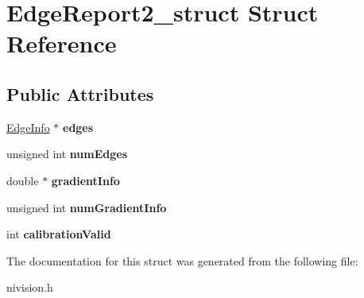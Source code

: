 \hypertarget{structEdgeReport2__struct}{
\section{EdgeReport2\_\-struct Struct Reference}
\label{structEdgeReport2__struct}
}
\subsection*{Public Attributes}
\begin{DoxyCompactItemize}
\item 
\hypertarget{structEdgeReport2__struct_a873de8db58b737707d22c33d0dc0609e}{
\hyperlink{structEdgeInfo__struct}{EdgeInfo} $\ast$ {\bfseries edges}}
\label{structEdgeReport2__struct_a873de8db58b737707d22c33d0dc0609e}

\item 
\hypertarget{structEdgeReport2__struct_a2e8f492c86b417580a4afa0974a94ba6}{
unsigned int {\bfseries numEdges}}
\label{structEdgeReport2__struct_a2e8f492c86b417580a4afa0974a94ba6}

\item 
\hypertarget{structEdgeReport2__struct_a9f1eaa71c1c6670886eca20a8b1d7bbe}{
double $\ast$ {\bfseries gradientInfo}}
\label{structEdgeReport2__struct_a9f1eaa71c1c6670886eca20a8b1d7bbe}

\item 
\hypertarget{structEdgeReport2__struct_ae3ce97361b1fae999cf448f646e45dda}{
unsigned int {\bfseries numGradientInfo}}
\label{structEdgeReport2__struct_ae3ce97361b1fae999cf448f646e45dda}

\item 
\hypertarget{structEdgeReport2__struct_ab2927da4cee79affd3ff6a10c01d6aed}{
int {\bfseries calibrationValid}}
\label{structEdgeReport2__struct_ab2927da4cee79affd3ff6a10c01d6aed}

\end{DoxyCompactItemize}


The documentation for this struct was generated from the following file:\begin{DoxyCompactItemize}
\item 
nivision.h\end{DoxyCompactItemize}
